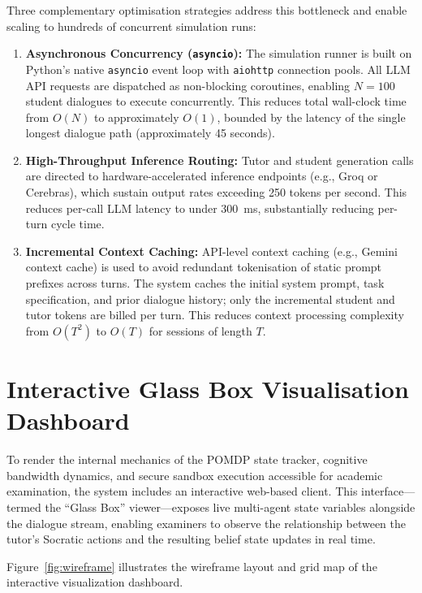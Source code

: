 \documentclass[11pt,a4paper]{report}
\begin{document}
Three complementary optimisation strategies address this bottleneck and enable scaling to hundreds of concurrent simulation runs:
\begin{enumerate}
    \item \textbf{Asynchronous Concurrency (\texttt{asyncio}):} The simulation runner is built on Python's native \texttt{asyncio} event loop with \texttt{aiohttp} connection pools. All LLM API requests are dispatched as non-blocking coroutines, enabling $N = 100$ student dialogues to execute concurrently. This reduces total wall-clock time from $O(N)$ to approximately $O(1)$, bounded by the latency of the single longest dialogue path (approximately 45 seconds).
    \item \textbf{High-Throughput Inference Routing:} Tutor and student generation calls are directed to hardware-accelerated inference endpoints (e.g., Groq or Cerebras), which sustain output rates exceeding 250 tokens per second. This reduces per-call LLM latency to under 300~ms, substantially reducing per-turn cycle time.
    \item \textbf{Incremental Context Caching:} API-level context caching (e.g., Gemini context cache) is used to avoid redundant tokenisation of static prompt prefixes across turns. The system caches the initial system prompt, task specification, and prior dialogue history; only the incremental student and tutor tokens are billed per turn. This reduces context processing complexity from $O(T^2)$ to $O(T)$ for sessions of length $T$.
\end{enumerate}

\section{Interactive Glass Box Visualisation Dashboard}
To render the internal mechanics of the POMDP state tracker, cognitive bandwidth dynamics, and secure sandbox execution accessible for academic examination, the system includes an interactive web-based client. This interface---termed the ``Glass Box'' viewer---exposes live multi-agent state variables alongside the dialogue stream, enabling examiners to observe the relationship between the tutor's Socratic actions and the resulting belief state updates in real time.

Figure~\ref{fig:wireframe} illustrates the wireframe layout and grid map of the interactive visualization dashboard.
\end{document}
